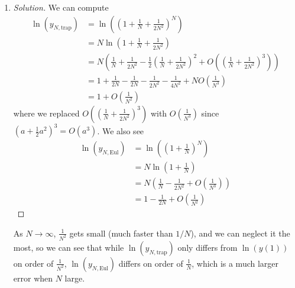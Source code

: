 \documentclass{article}
\begin{document}
\begin{enumerate}
\begin{proof}[Solution]
		Hence, Euler's method at the $N$th step, which is the approximation at $y(Nh) = y(1)$
		gives $y_{N,\text{Eul}} = (1 + \frac{1}{N})^N$.
	\end{proof}
	\item \begin{proof}[Solution]\let\qed\relax
		We can compute
		\begin{align*}
			\ln(y_{N,\text{trap}})
			&= \ln\left(\left(1 + \frac{1}{N} + \frac{1}{2N^2}\right)^N\right)\\
			&= N\ln\left(1 + \frac{1}{N} + \frac{1}{2N^2}\right)\\
			&= N\left(\frac{1}{N}+\frac{1}{2N^2} -
				\frac12\left(\frac{1}{N} + \frac{1}{2N^2}\right)^2
			+ O\left(\left(\frac{1}{N}+\frac{1}{2N^2}\right)^3\right)\right)\\
			&= 1 + \frac{1}{2N}
			- \frac{1}{2N} - \frac{1}{2N^2} - \frac{1}{4N^2}
			+ NO\left(\frac{1}{N^3}\right)\\
			&= 1 + O\left(\frac{1}{N^2}\right)
		\end{align*}
		where we replaced $O\left(\left(\frac{1}{N}+\frac{1}{2N^2}\right)^3\right)$
		with $O\left(\frac{1}{N^3}\right)$
		since $(a + \frac{1}{2}a^2)^3 = O(a^3)$.
		We also see
		\begin{align*}
			\ln(y_{N,\text{Eul}})
			&= \ln\left(\left(1 + \frac{1}{N}\right)^N\right)\\
			&= N\ln\left(1 + \frac{1}{N}\right)\\
			&= N\left(\frac{1}{N} - \frac{1}{2N^2} + O\left(\frac{1}{N^3}\right)\right)\\
			&= 1 - \frac{1}{2N} + O\left(\frac{1}{N^2}\right)
		\end{align*}
	\end{proof}
	As $N \to \infty$, $\frac{1}{N^2}$ gets small (much faster than $1/N$),
	and we can neglect it the most,
	so we can see that while $\ln(y_{N,\text{trap}})$ only differs from
	$\ln(y(1))$ on order of $\frac{1}{N^2}$,
	$\ln(y_{N,\text{Eul}})$ differs on order of $\frac{1}{N}$,
	which is a much larger error when $N$ large.
\end{enumerate}
\end{document}
